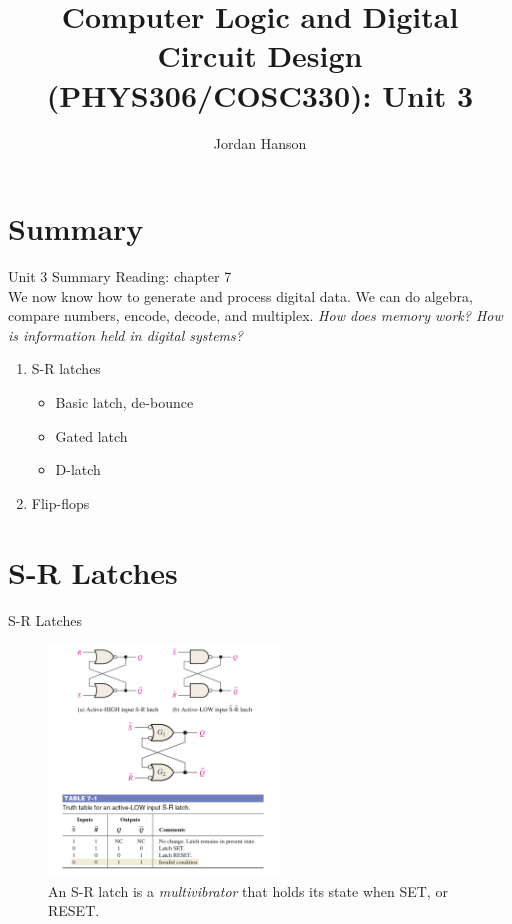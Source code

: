\documentclass{beamer}
\title{Computer Logic and Digital Circuit Design (PHYS306/COSC330): Unit 3}
\author{Jordan Hanson}
\institute{Whittier College Department of Physics and Astronomy}
\begin{document}
\maketitle

\section{Summary}

\begin{frame}{Unit 3 Summary}
\alert{Reading: chapter 7} \\
We now know how to generate and process digital data. We can do algebra, compare numbers, encode, decode, and multiplex.  \textit{How does memory work?  How is information held in digital systems?}
\begin{enumerate}
\item S-R latches
\begin{itemize}
\item Basic latch, de-bounce
\item Gated latch
\item D-latch
\end{itemize}
\item Flip-flops
\end{enumerate}
\end{frame}

\section{S-R Latches}

\begin{frame}{S-R Latches}
\begin{figure}
\centering
\includegraphics[width=0.55\textwidth]{figures/SR1.pdf}
\caption{\label{fig:sr1} An S-R latch is a \textit{multivibrator} that holds its state when SET, or RESET.}
\end{figure}
\end{frame}
\end{document}
